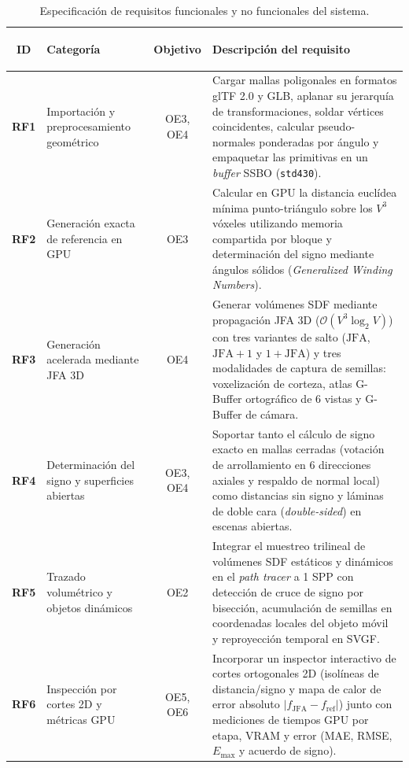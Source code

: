 \begin{table}[htbp]
  \centering
  \footnotesize
  \caption{Especificación de requisitos funcionales y no funcionales del sistema.}
  \label{tab:requisitos_sistema}
  \begin{tabularx}{\textwidth}{|>{\bfseries}c|>{\bfseries\raggedright\arraybackslash}p{31mm}|c|>{\raggedright\arraybackslash}X|}
    \hline
    \rowcolor{tablegray} ID & Categoría & Objetivo & Descripción del requisito \\ \hline
    RF1 & Importación y preprocesamiento geométrico & OE3, OE4 & Cargar mallas poligonales en formatos glTF 2.0 y GLB, aplanar su jerarquía de transformaciones, soldar vértices coincidentes, calcular pseudo-normales ponderadas por ángulo y empaquetar las primitivas en un \textit{buffer} SSBO (\texttt{std430}). \\ \hline
    RF2 & Generación exacta de referencia en GPU & OE3 & Calcular en GPU la distancia euclídea mínima punto-triángulo sobre los $V^3$ vóxeles utilizando memoria compartida por bloque y determinación del signo mediante ángulos sólidos (\textit{Generalized Winding Numbers}). \\ \hline
    RF3 & Generación acelerada mediante JFA 3D & OE4 & Generar volúmenes SDF mediante propagación JFA 3D ($\mathcal{O}(V^3 \log_2 V)$) con tres variantes de salto ($\text{JFA}$, $\text{JFA}+1$ y $1+\text{JFA}$) y tres modalidades de captura de semillas: voxelización de corteza, atlas G-Buffer ortográfico de 6 vistas y G-Buffer de cámara. \\ \hline
    RF4 & Determinación del signo y superficies abiertas & OE3, OE4 & Soportar tanto el cálculo de signo exacto en mallas cerradas (votación de arrollamiento en 6 direcciones axiales y respaldo de normal local) como distancias sin signo y láminas de doble cara (\textit{double-sided}) en escenas abiertas. \\ \hline
    RF5 & Trazado volumétrico y objetos dinámicos & OE2 & Integrar el muestreo trilineal de volúmenes SDF estáticos y dinámicos en el \textit{path tracer} a 1 SPP con detección de cruce de signo por bisección, acumulación de semillas en coordenadas locales del objeto móvil y reproyección temporal en SVGF. \\ \hline
    RF6 & Inspección por cortes 2D y métricas GPU & OE5, OE6 & Incorporar un inspector interactivo de cortes ortogonales 2D (isolíneas de distancia/signo y mapa de calor de error absoluto $|f_{\text{JFA}} - f_{\text{ref}}|$) junto con mediciones de tiempos GPU por etapa, VRAM y error (MAE, RMSE, $E_{\max}$ y acuerdo de signo). \\ \hline

\end{tabularx}
\end{table}
